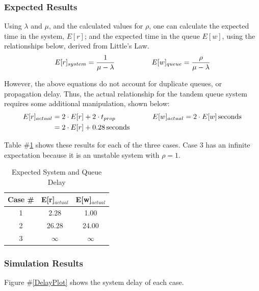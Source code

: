 \documentclass{article}
\begin{document}
\subsubsection{Expected Results}
Using $\lambda$ and $\mu$, and the calculated values for $\rho$, one can calculate the expected time in the system, $E[r]$; and the expected time in the queue $E[w]$, using the relationships below, derived from Little's Law.
\begin{align*}
E[r]_{system} = \frac{1}{\mu - \lambda} \hspace{0.15\textwidth} E[w]_{queue} = \frac{\rho}{\mu - \lambda} \\
\end{align*}

However, the above equations do not account for duplicate queues, or propagation delay.
Thus, the actual relationship for the tandem queue system requires some additional manipulation, shown below:
\begin{align*}
 E[r]_{actual} &= 2 \cdot E[r] + 2 \cdot t_{prop} \hspace{.15\textwidth} E[w]_{actual} = 2 \cdot E[w] \, \text{seconds}	\\
			   &=2 \cdot E[r] + 0.28 \, \text{seconds}  \\
\end{align*}

Table \#\ref{tab:expectDelay} shows these results for each of the three cases.
Case 3 has an infinite expectation because it is an unstable system with $\rho = 1$.
\begin{table}[h!]
\centering
\begin{tabular}{|c|c|c|} \hline
\textbf{Case \#} & \textbf{E[r]$_{actual}$} & \textbf{E[w]$_{actual}$} \\ \hline
1 & 2.28 & 1.00  \\ \hline
2 & 26.28 & 24.00 \\ \hline
3 & $\infty$ & $\infty$ \\ \hline 
\end{tabular}
\caption{Expected System and Queue Delay}
\label{tab:expectDelay}
\end{table}

\newpage
\subsubsection{Simulation Results}
Figure \#\ref{DelayPlot} shows the system delay of each case.
\end{document}
